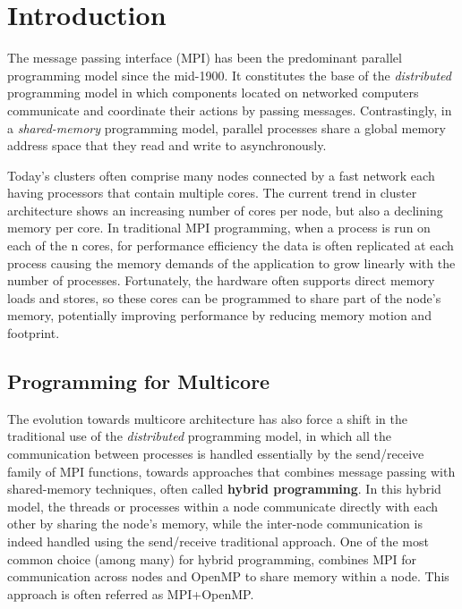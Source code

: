 \section{Introduction} \label{introduction}
The message passing interface (MPI) has been the predominant parallel programming model since the mid-1900. It constitutes the base of the \emph{distributed} programming model in which components located on networked computers communicate and coordinate their actions by passing messages. Contrastingly, in a \emph{shared-memory} programming model, parallel processes share a global memory address space that they read and write to asynchronously. 

Today's clusters often comprise many nodes connected by a fast network each having processors that contain multiple cores. The current trend in cluster architecture shows an increasing number of cores per node, but also a declining memory per core. In traditional MPI programming, when a process is run on each of the n cores, for performance efficiency the data is often replicated at each process causing the memory demands of the application to grow linearly with the number of processes. Fortunately, the hardware often supports direct memory loads and stores, so these cores can be programmed to share part of the node's memory, potentially improving performance by reducing memory motion and footprint\cite{UsingAdvancedMPI}. 



\subsection*{Programming for Multicore}

The evolution towards multicore architecture has also force a shift in the traditional use of the \emph{distributed} programming model, in which all the communication between processes is handled essentially by the send/receive family of MPI functions, towards approaches that combines message passing with shared-memory techniques, often called \textbf{hybrid programming}\cite{UsingAdvancedMPI}. In this hybrid model, the threads or processes within a node communicate directly with each other by sharing the node's memory, while the inter-node communication is indeed handled using the send/receive traditional approach. One of the most common choice (among many) for hybrid programming, combines MPI for communication across nodes and OpenMP to share memory within a node. This approach is often referred as MPI+OpenMP.

